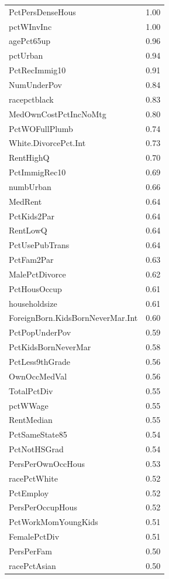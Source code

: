 \documentclass[
  11pt,
]{article}
\begin{document}
\begin{longtable}[t]{>{}l|c}
\endfoot
\bottomrule
\endlastfoot
PctPersDenseHous & 1.00\\
pctWInvInc & 1.00\\
agePct65up & 0.96\\
pctUrban & 0.94\\
PctRecImmig10 & 0.91\\
\addlinespace
NumUnderPov & 0.84\\
racepctblack & 0.83\\
MedOwnCostPctIncNoMtg & 0.80\\
PctWOFullPlumb & 0.74\\
White.DivorcePct.Int & 0.73\\
\addlinespace
RentHighQ & 0.70\\
PctImmigRec10 & 0.69\\
numbUrban & 0.66\\
MedRent & 0.64\\
PctKids2Par & 0.64\\
\addlinespace
RentLowQ & 0.64\\
PctUsePubTrans & 0.64\\
PctFam2Par & 0.63\\
MalePctDivorce & 0.62\\
PctHousOccup & 0.61\\
\addlinespace
householdsize & 0.61\\
ForeignBorn.KidsBornNeverMar.Int & 0.60\\
PctPopUnderPov & 0.59\\
PctKidsBornNeverMar & 0.58\\
PctLess9thGrade & 0.56\\
\addlinespace
OwnOccMedVal & 0.56\\
TotalPctDiv & 0.55\\
pctWWage & 0.55\\
RentMedian & 0.55\\
PctSameState85 & 0.54\\
\addlinespace
PctNotHSGrad & 0.54\\
PersPerOwnOccHous & 0.53\\
racePctWhite & 0.52\\
PctEmploy & 0.52\\
PersPerOccupHous & 0.52\\
\addlinespace
PctWorkMomYoungKids & 0.51\\
FemalePctDiv & 0.51\\
PersPerFam & 0.50\\
racePctAsian & 0.50\\*
\end{longtable}
\endgroup{}
\end{document}
